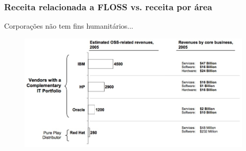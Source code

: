 \documentclass[xcolor=dvipsnames]{beamer}
\begin{document}
\begin{frame}
	\frametitle{Receita relacionada a FLOSS vs. receita por área}
	Corporações não tem fins humanitários... \pause
	\begin{figure}
	\begin{center}
 	\includegraphics[scale=0.75]{receita_floss.jpg}\\[0.3cm]
	\end{center}
	\end{figure}
\end{frame}
\end{document}
